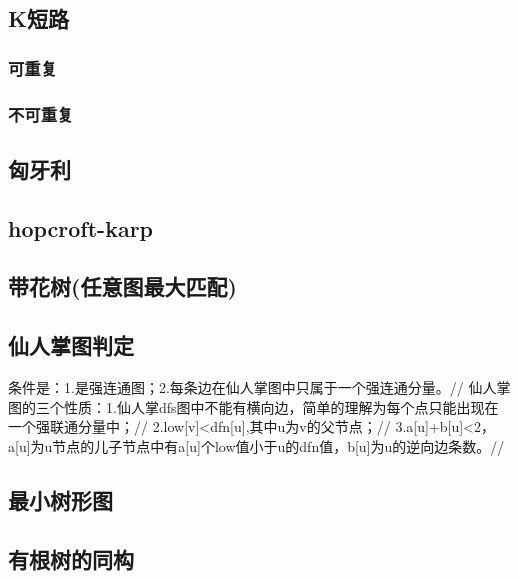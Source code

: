 \documentclass[landscape,a4paper]{article}
\begin{document}
\begin{spacing}{0.3}
\begin{multicols}{2}
		
		\subsection{K短路}
	\subsubsection{可重复}
	
	\subsubsection{不可重复}
	
	\subsection{匈牙利}
	
	\subsection{hopcroft-karp}
	
	\subsection{带花树(任意图最大匹配)}
	
	\subsection{仙人掌图判定}
	条件是：1.是强连通图；2.每条边在仙人掌图中只属于一个强连通分量。//
	仙人掌图的三个性质：1.仙人掌dfs图中不能有横向边，简单的理解为每个点只能出现在一个强联通分量中；//
	2.low[v]<dfn[u],其中u为v的父节点；//
	3.a[u]+b[u]<2，a[u]为u节点的儿子节点中有a[u]个low值小于u的dfn值，b[u]为u的逆向边条数。//
	

\subsection{最小树形图}
	
	\subsection{有根树的同构}
	

\end{multicols}
\end{spacing}
\end{document}
